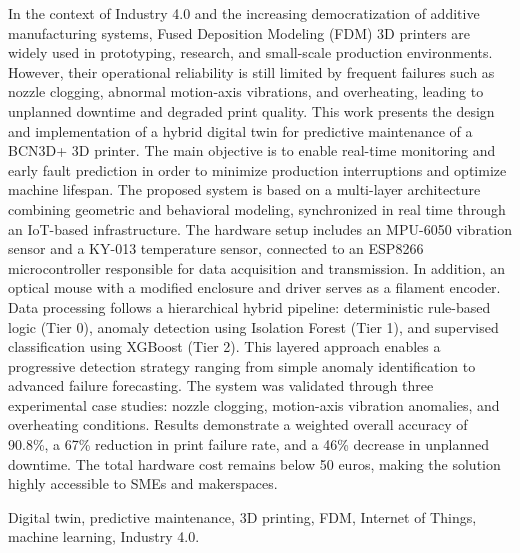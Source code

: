 \begin{abstractEn}
	In the context of Industry 4.0 and the increasing democratization of additive manufacturing systems, Fused Deposition Modeling (FDM) 3D printers are widely used in prototyping, research, and small-scale production environments. However, their operational reliability is still limited by frequent failures such as nozzle clogging, abnormal motion-axis vibrations, and overheating, leading to unplanned downtime and degraded print quality. 
	This work presents the design and implementation of a hybrid digital twin for predictive maintenance of a BCN3D+ 3D printer. The main objective is to enable real-time monitoring and early fault prediction in order to minimize production interruptions and optimize machine lifespan. 
	The proposed system is based on a multi-layer architecture combining geometric and behavioral modeling, synchronized in real time through an IoT-based infrastructure. The hardware setup includes an MPU-6050 vibration sensor and a KY-013 temperature sensor, connected to an ESP8266 microcontroller responsible for data acquisition and transmission. In addition, an optical mouse with a modified enclosure and driver serves as a filament encoder. 
	Data processing follows a hierarchical hybrid pipeline: deterministic rule-based logic (Tier 0), anomaly detection using Isolation Forest (Tier 1), and supervised classification using XGBoost (Tier 2). This layered approach enables a progressive detection strategy ranging from simple anomaly identification to advanced failure forecasting. 
	The system was validated through three experimental case studies: nozzle clogging, motion-axis vibration anomalies, and overheating conditions. Results demonstrate a weighted overall accuracy of 90.8\%, a 67\% reduction in print failure rate, and a 46\% decrease in unplanned downtime. The total hardware cost remains below 50 euros, making the solution highly accessible to SMEs and makerspaces.
\end{abstractEn}

\begin{keywordsEn}
	Digital twin, predictive maintenance, 3D printing, FDM, Internet of Things, machine learning, Industry 4.0.
\end{keywordsEn}
